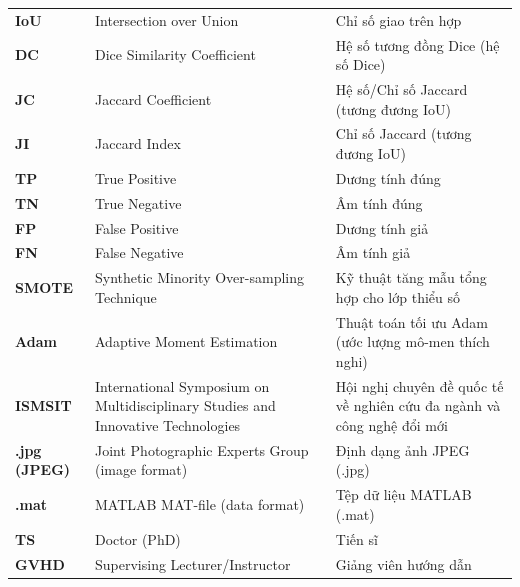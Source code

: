 \documentclass[../DoAn.tex]{subfiles}
\begin{document}
\begin{center}
\begin{tabular}{l  p{6cm} p{7cm}}
\textbf{IoU} & Intersection over Union & Chỉ số giao trên hợp \\
\textbf{DC} & Dice Similarity Coefficient & Hệ số tương đồng Dice (hệ số Dice) \\
\textbf{JC} & Jaccard Coefficient & Hệ số/Chỉ số Jaccard (tương đương IoU) \\
\textbf{JI} & Jaccard Index & Chỉ số Jaccard (tương đương IoU) \\
\textbf{TP} & True Positive & Dương tính đúng \\
\textbf{TN} & True Negative & Âm tính đúng \\
\textbf{FP} & False Positive & Dương tính giả \\
\textbf{FN} & False Negative & Âm tính giả \\
\textbf{SMOTE} & Synthetic Minority Over-sampling Technique & Kỹ thuật tăng mẫu tổng hợp cho lớp thiểu số \\
\textbf{Adam} & Adaptive Moment Estimation & Thuật toán tối ưu Adam (ước lượng mô-men thích nghi) \\
\textbf{ISMSIT} & International Symposium on Multidisciplinary Studies and Innovative Technologies & Hội nghị chuyên đề quốc tế về nghiên cứu đa ngành và công nghệ đổi mới \\
\textbf{.jpg (JPEG)} & Joint Photographic Experts Group (image format) & Định dạng ảnh JPEG (.jpg) \\
\textbf{.mat} & MATLAB MAT-file (data format) & Tệp dữ liệu MATLAB (.mat) \\
\textbf{TS} & Doctor (PhD) & Tiến sĩ \\
\textbf{GVHD} & Supervising Lecturer/Instructor & Giảng viên hướng dẫn \\

\hline

\end{tabular}
\end{center}
\endgroup
\end{document}

